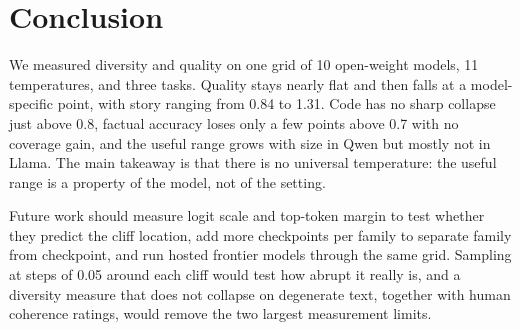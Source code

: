 \section{Conclusion}
\label{sec:conclusion}

We measured diversity and quality on one grid of 10 open-weight models, 11 temperatures, and three tasks. Quality stays nearly flat and then falls at a model-specific point, with story \Tu ranging from 0.84 to 1.31. Code has no sharp collapse just above 0.8, factual accuracy loses only a few points above 0.7 with no coverage gain, and the useful range grows with size in Qwen but mostly not in Llama. The main takeaway is that there is no universal temperature: the useful range is a property of the model, not of the setting.

Future work should measure logit scale and top-token margin to test whether they predict the cliff location, add more checkpoints per family to separate family from checkpoint, and run hosted frontier models through the same grid. Sampling at steps of 0.05 around each cliff would test how abrupt it really is, and a diversity measure that does not collapse on degenerate text, together with human coherence ratings, would remove the two largest measurement limits.
